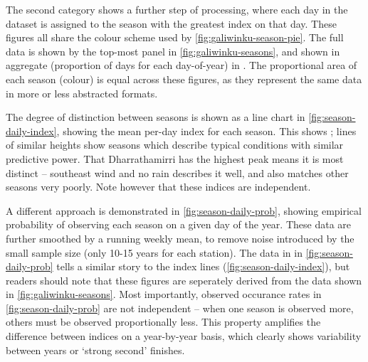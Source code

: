 The second category shows a further step of processing, where each day in
the dataset is assigned to the season with the greatest index on that day.
These figures all share the colour scheme used by \cref{fig:galiwinku-season-pie}.
The full data is shown by the top-most panel in \cref{fig:galiwinku-seasons},
and shown in aggregate (proportion of days for each day-of-year) in
.  The proportional area of each season (colour)
is equal across these figures, as they represent the same data in more
or less abstracted formats.

The degree of distinction between seasons is shown as a line chart in
\cref{fig:season-daily-index}, showing the mean per-day index for each
season.  This shows ; lines of similar heights show seasons which describe
typical conditions with similar predictive power.  That Dharrathamirri
has the highest peak means it is most distinct -- southeast wind and no
rain describes it well, and also matches other seasons very poorly.
Note however that these indices are independent.

A different approach is demonstrated in \cref{fig:season-daily-prob}, showing
empirical probability of observing each season on a given day of the year.
These data are further smoothed by a running weekly mean, to remove noise
introduced by the small sample size (only 10-15 years for each station).
%
The data in in \cref{fig:season-daily-prob} tells a similar story to
the index lines (\cref{fig:season-daily-index}), but readers should note
that these figures are seperately derived from the data shown in
\cref{fig:galiwinku-seasons}.  Most importantly, observed occurance
rates in \cref{fig:season-daily-prob} are not independent -- when one season is observed more, others
must be observed proportionally less.  This property amplifies the
difference between indices on a year-by-year basis, which clearly
shows variability between years or `strong second' finishes.



